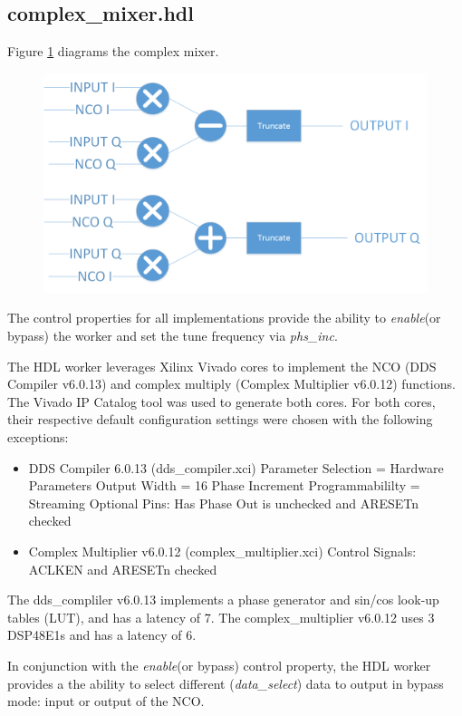 \documentclass{article}
\def\comp{complex\_mixer}
\begin{document}
\subsection*{\comp.hdl}
\begin{flushleft}
	Figure \ref{fig:complex_mixer} diagrams the complex mixer.\medskip

	\begin{figure}[h]
		\centering\captionsetup{type=figure}\includegraphics[scale=0.4]{complex_mixer_block_diagram}
		\label{fig:complex_mixer}
	\end{figure}

	The control properties for all implementations provide the ability to \textit{enable}(or bypass) the worker and set the tune frequency via \textit{phs\_inc}.\medskip

	The HDL worker leverages Xilinx Vivado cores to implement the NCO (DDS Compiler v6.0.13) and complex multiply (Complex Multiplier v6.0.12) functions. The Vivado IP Catalog tool was used to generate both cores. For both cores, their respective default configuration settings were chosen with the following exceptions:

	\begin{itemize}
		\item DDS Compiler 6.0.13 (dds\_compiler.xci)
			\subitem Parameter Selection = Hardware Parameters
			\subitem Output Width = 16
			\subitem Phase Increment Programmabililty = Streaming
			\subitem Optional Pins: Has Phase Out is unchecked and ARESETn checked
		\item Complex Multiplier v6.0.12 (complex\_multiplier.xci)
			\subitem Control Signals: ACLKEN and ARESETn checked
	\end{itemize}

	The dds\_compliler v6.0.13 implements a phase generator and sin/cos look-up tables (LUT), and has a latency of 7.  The complex\_multiplier v6.0.12 uses 3 DSP48E1s and has a latency of 6.\medskip

	In conjunction with the \textit{enable}(or bypass) control property, the HDL worker provides a the ability to select different (\textit{data\_select}) data to output in bypass mode: input or output of the NCO.\medskip
\end{flushleft}
\end{document}
